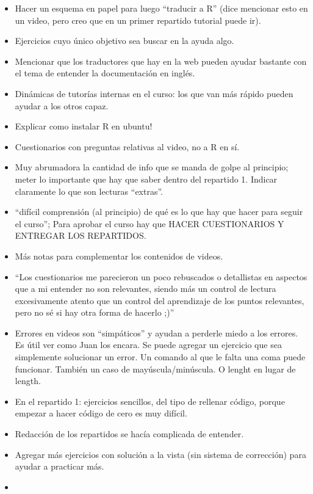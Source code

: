\documentclass[]{article}
\begin{document}
\begin{itemize}
\item
  Hacer un esquema en papel para luego ``traducir a R'' (dice mencionar
  esto en un video, pero creo que en un primer repartido tutorial puede
  ir).
\item
  Ejercicios cuyo único objetivo sea buscar en la ayuda algo.
\item
  Mencionar que los traductores que hay en la web pueden ayudar bastante
  con el tema de entender la documentación en inglés.
\item
  Dinámicas de tutorías internas en el curso: los que van más rápido
  pueden ayudar a los otros capaz.
\item
  Explicar como instalar R en ubuntu!
\item
  Cuestionarios con preguntas relativas al video, no a R en sí.
\item
  Muy abrumadora la cantidad de info que se manda de golpe al principio;
  meter lo importante que hay que saber dentro del repartido 1. Indicar
  claramente lo que son lecturas ``extras''.
\item
  ``difícil comprensión (al principio) de qué es lo que hay que hacer
  para seguir el curso''; Para aprobar el curso hay que HACER
  CUESTIONARIOS Y ENTREGAR LOS REPARTIDOS.
\item
  Más notas para complementar los contenidos de videos.
\item
  ``Los cuestionarios me parecieron un poco rebuscados o detallistas en
  aspectos que a mi entender no son relevantes, siendo más un control de
  lectura excesivamente atento que un control del aprendizaje de los
  puntos relevantes, pero no sé si hay otra forma de hacerlo ;)''
\item
  Errores en videos son ``simpáticos'' y ayudan a perderle miedo a los
  errores. Es útil ver como Juan los encara. Se puede agregar un
  ejercicio que sea simplemente solucionar un error. Un comando al que
  le falta una coma puede funcionar. También un caso de
  mayúscula/minúscula. O lenght en lugar de length.
\item
  En el repartido 1: ejercicios sencillos, del tipo de rellenar código,
  porque empezar a hacer código de cero es muy difícil.
\item
  Redacción de los repartidos se hacía complicada de entender.
\item
  Agregar más ejercicios con solución a la vista (sin sistema de
  corrección) para ayudar a practicar más.
\item

\end{itemize}
\end{document}
